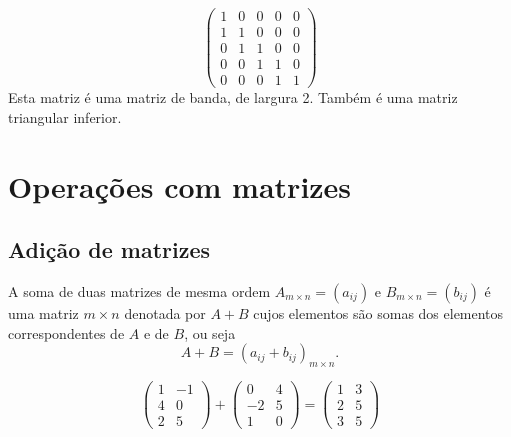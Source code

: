 \begin{exemplo}
    \begin{equation*}
        \begin{pmatrix}
            1 & 0 & 0 & 0 & 0\\
            1 & 1 & 0 & 0 & 0\\
            0 & 1 & 1 & 0 & 0\\
            0 & 0 & 1 & 1 & 0\\
            0 & 0 & 0 & 1 & 1
		\end{pmatrix}
    \end{equation*}
    Esta matriz é uma matriz de banda, de largura 2. Também é uma matriz triangular inferior.
\end{exemplo}

\section{Operações com matrizes}

\subsection{Adição de matrizes}

A soma de duas matrizes de mesma ordem $A_{m\times n} = (a_{ij})$ e $B_{m\times n}=(b_{ij})$ é uma matriz $m\times n$ denotada por $A+B$ cujos elementos são somas dos elementos correspondentes de $A$ e de $B$, ou seja
\begin{equation*}
    A+B = (a_{ij}+ b_{ij})_{m\times n}.
\end{equation*}

\begin{exemplo}
    \begin{equation*}
        \begin{pmatrix}
            1 & -1\\
            4 & 0 \\
            2 & 5 
        \end{pmatrix}
        +
        \begin{pmatrix}
            0 & 4\\
            -2 & 5\\
            1 & 0
        \end{pmatrix}
        =
        \begin{pmatrix}
            1 & 3\\
            2 & 5\\
            3 & 5
        \end{pmatrix}
    \end{equation*}
\end{exemplo}

